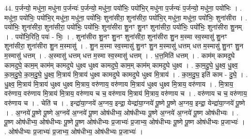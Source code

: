 \documentclass[17pt]{extarticle}
\begin{document}
44. प॒र्जन्यो॒ मधु॑ना॒ मधु॑ना प॒र्जन्यः॑ प॒र्जन्यो॒ मधु॑ना॒ पयो॑भिः॒ पयो॑भि॒र् मधु॑ना प॒र्जन्यः॑ प॒र्जन्यो॒ मधु॑ना॒ पयो॑भिः । . मधु॑ना॒ पयो॑भिः॒ पयो॑भि॒र् मधु॑ना॒ मधु॑ना॒ पयो॑भिः॒ शुना॑सीरा॒ शुना॑सीरा॒ पयो॑भि॒र् मधु॑ना॒ मधु॑ना॒ पयो॑भिः॒ शुना॑सीरा । . पयो॑भिः॒ शुना॑सीरा॒ शुना॑सीरा॒ पयो॑भिः॒ पयो॑भिः॒ शुना॑सीरा शु॒नꣳ शु॒नꣳ शुना॑सीरा॒ पयो॑भिः॒ पयो॑भिः॒ शुना॑सीरा शु॒नम् । . पयो॑भि॒रिति॒ पयः॑ - भिः॒ । . शुना॑सीरा शु॒नꣳ शु॒नꣳ शुना॑सीरा॒ शुना॑सीरा शु॒न म॒स्मा स्व॒स्मासु॑ शु॒नꣳ शुना॑सीरा॒ शुना॑सीरा शु॒न म॒स्मासु॑ । . शु॒न म॒स्मा स्व॒स्मासु॑ शु॒नꣳ शु॒न म॒स्मासु॑ धत्तम् धत्त म॒स्मासु॑ शु॒नꣳ शु॒न म॒स्मासु॑ धत्तम् । . अ॒स्मासु॑ धत्तम् धत्त म॒स्मा स्व॒स्मासु॑ धत्तम् । . ध॒त्त॒मिति॑ धत्तम् । . काम॑म् कामदुघे कामदुघे॒ काम॒म् काम॑म् कामदुघे धुक्ष्व धुक्ष्व कामदुघे॒ काम॒म् काम॑म् कामदुघे धुक्ष्व । . का॒म॒दु॒घे॒ धु॒क्ष्व॒ धु॒क्ष्व॒ का॒म॒दु॒घे॒ का॒म॒दु॒घे॒ धु॒क्ष्व॒ मि॒त्राय॑ मि॒त्राय॑ धुक्ष्व कामदुघे कामदुघे धुक्ष्व मि॒त्राय॑ । . का॒म॒दु॒घ॒ इति॑ काम - दु॒घे॒ । . धु॒क्ष्व॒ मि॒त्राय॑ मि॒त्राय॑ धुक्ष्व धुक्ष्व मि॒त्राय॒ वरु॑णाय॒ वरु॑णाय मि॒त्राय॑ धुक्ष्व धुक्ष्व मि॒त्राय॒ वरु॑णाय । . मि॒त्राय॒ वरु॑णाय॒ वरु॑णाय मि॒त्राय॑ मि॒त्राय॒ वरु॑णाय च च॒ वरु॑णाय मि॒त्राय॑ मि॒त्राय॒ वरु॑णाय च । . वरु॑णाय च च॒ वरु॑णाय॒ वरु॑णाय च । . चेति॑ च । . इन्द्रा॑या॒ग्नये॑ अ॒ग्नय॒ इन्द्रा॒ येन्द्रा॑या॒ग्नये॑ पू॒ष्णे पू॒ष्णे अ॒ग्नय॒ इन्द्रा॒ येन्द्रा॑या॒ग्नये॑ पू॒ष्णे । . अ॒ग्नये॑ पू॒ष्णे पू॒ष्णे अ॒ग्नये॑ अ॒ग्नये॑ पू॒ष्ण ओष॑धीभ्य॒ ओष॑धीभ्यः पू॒ष्णे 
अ॒ग्नये॑ अ॒ग्नये॑ पू॒ष्ण ओष॑धीभ्यः । . पू॒ष्ण ओष॑धीभ्य॒ ओष॑धीभ्यः पू॒ष्णे पू॒ष्ण ओष॑धीभ्यः प्र॒जाभ्यः॑ प्र॒जाभ्य॒ ओष॑धीभ्यः पू॒ष्णे पू॒ष्ण ओष॑धीभ्यः प्र॒जाभ्यः॑ । . ओष॑धीभ्यः प्र॒जाभ्यः॑ प्र॒जाभ्य॒ ओष॑धीभ्य॒ ओष॑धीभ्यः प्र॒जाभ्यः॑ । \newline
\end{document}

